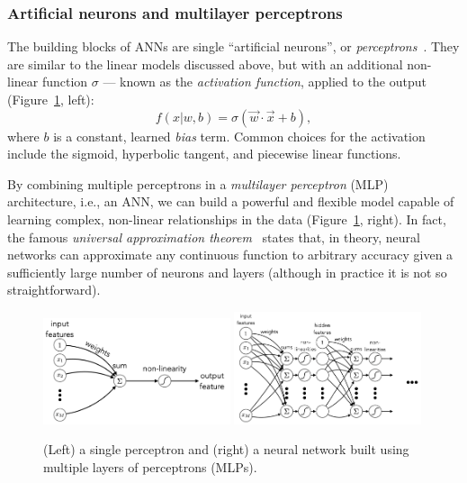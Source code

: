 \subsubsection{Artificial neurons and multilayer perceptrons}

The building blocks of ANNs are single ``artificial neurons'', or \textit{perceptrons}~\cite{rosenblatt1958perceptron}.
They are similar to the linear models discussed above, but with an additional non-linear function $\sigma$ --- known as the \textit{activation function}, applied to the output (Figure~\ref{fig:03_ml_perceptron}, left):
\begin{equation}
    \label{eq:03_ml_perceptron}
    f(x|w, b) = \sigma(\vec{w} \cdot \vec{x} + b),
\end{equation}
where $b$ is a constant, learned \textit{bias} term.
Common choices for the activation include the sigmoid, hyperbolic tangent, and piecewise linear functions.

By combining multiple perceptrons in a \textit{multilayer perceptron} (MLP) architecture, i.e., an ANN, we can build a powerful and flexible model capable of learning complex, non-linear relationships in the data (Figure~\ref{fig:03_ml_perceptron}, right).
In fact, the famous \textit{universal approximation theorem}~\cite{hornik1989multilayer} states that, in theory, neural networks can approximate any continuous function to arbitrary accuracy given a sufficiently large number of neurons and layers (although in practice it is not so straightforward).

\begin{figure}[ht]
    \centering
    \includegraphics[width=0.49\textwidth]{figures/03-ML/perceptron}
    \includegraphics[width=0.49\textwidth]{figures/03-ML/nn}
    \caption{(Left) a single perceptron and (right) a neural network built using multiple layers of perceptrons (MLPs).}
    \label{fig:03_ml_perceptron}
\end{figure}

